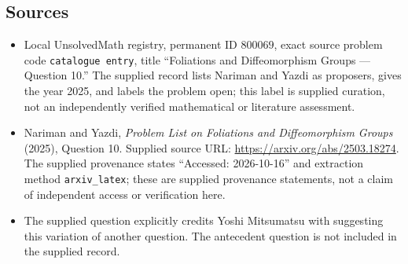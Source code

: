 \documentclass[11pt]{article}
\begin{document}
\subsection{Sources}
\begin{itemize}
\item Local UnsolvedMath registry, permanent ID \(800069\), exact source problem code \texttt{catalogue entry}, title ``Foliations and Diffeomorphism Groups --- Question 10.'' The supplied record lists Nariman and Yazdi as proposers, gives the year 2025, and labels the problem open; this label is supplied curation, not an independently verified mathematical or literature assessment.
\item Nariman and Yazdi, \emph{Problem List on Foliations and Diffeomorphism Groups} (2025), Question 10. Supplied source URL: \url{https://arxiv.org/abs/2503.18274}. The supplied provenance states ``Accessed: 2026-10-16'' and extraction method \texttt{arxiv\_latex}; these are supplied provenance statements, not a claim of independent access or verification here.
\item The supplied question explicitly credits Yoshi Mitsumatsu with suggesting this variation of another question. The antecedent question is not included in the supplied record.
\end{itemize}
\end{document}
